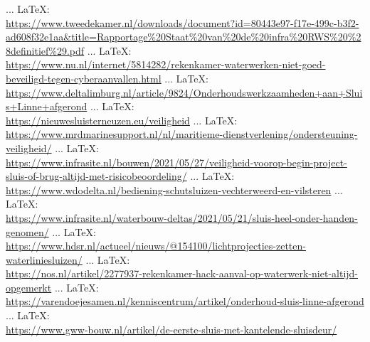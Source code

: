 \begin{thebibliography}{99}
%
%
%





 ... \LaTeX:\\ \url{https://www.tweedekamer.nl/downloads/document?id=80443e97-f17e-499c-b3f2-ad608f32e1aa&title=Rapportage%20Staat%20van%20de%20infra%20RWS%20%28definitief%29.pdf}
 ... \LaTeX:\\ \url{https://www.nu.nl/internet/5814282/rekenkamer-waterwerken-niet-goed-beveiligd-tegen-cyberaanvallen.html}
 ... \LaTeX:\\ \url{https://www.deltalimburg.nl/article/9824/Onderhoudswerkzaamheden+aan+Sluis+Linne+afgerond}
 ... \LaTeX:\\ \url{https://nieuwesluisterneuzen.eu/veiligheid}
 ... \LaTeX:\\ \url{https://www.mrdmarinesupport.nl/nl/maritieme-dienstverlening/ondersteuning-veiligheid/}
 ... \LaTeX:\\ \url{https://www.infrasite.nl/bouwen/2021/05/27/veiligheid-voorop-begin-project-sluis-of-brug-altijd-met-risicobeoordeling/}
 ... \LaTeX:\\ \url{https://www.wdodelta.nl/bediening-schutsluizen-vechterweerd-en-vilsteren}
 ... \LaTeX:\\ \url{https://www.infrasite.nl/waterbouw-deltas/2021/05/21/sluis-heel-onder-handen-genomen/}
 ... \LaTeX:\\ \url{https://www.hdsr.nl/actueel/nieuws/@154100/lichtprojecties-zetten-waterliniesluizen/}
 ... \LaTeX:\\ \url{https://nos.nl/artikel/2277937-rekenkamer-hack-aanval-op-waterwerk-niet-altijd-opgemerkt}
 ... \LaTeX:\\ \url{https://varendoejesamen.nl/kenniscentrum/artikel/onderhoud-sluis-linne-afgerond}
 ... \LaTeX:\\ \url{https://www.gww-bouw.nl/artikel/de-eerste-sluis-met-kantelende-sluisdeur/}

\end{thebibliography}
